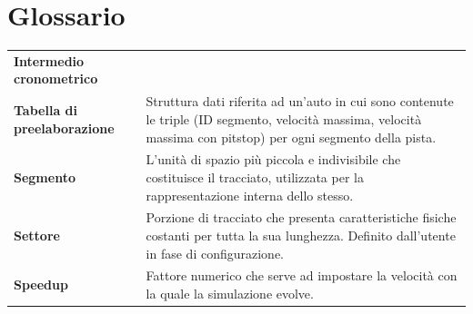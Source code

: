 \documentclass[11pt,a4paper]{report}
\newcommand{\term}[2]{\textbf{#1} & #2 \\}
\begin{document}
\chapter{Glossario}

\begin{tabularx}{\textwidth}{lX}
\term{Intermedio cronometrico}{}
\term{Tabella di preelaborazione}{Struttura dati riferita ad un'auto in cui sono contenute le triple (ID segmento, velocità massima, velocità massima con pitstop) per ogni segmento della pista.}
\term{Segmento}{L'unità di spazio più piccola e indivisibile che costituisce il tracciato, utilizzata per la rappresentazione interna dello stesso.}
\term{Settore}{Porzione di tracciato che presenta caratteristiche fisiche costanti per tutta la sua lunghezza. Definito dall'utente in fase di configurazione.}
\term{Speedup}{Fattore numerico che serve ad impostare la velocità con la quale la simulazione evolve.}
\end{tabularx}
\end{document}
